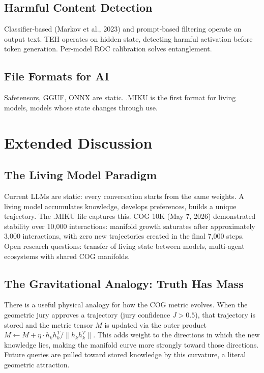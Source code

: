 \documentclass[11pt]{article}
\begin{document}
\subsection{Harmful Content Detection}
Classifier-based (Markov et al., 2023) and prompt-based filtering operate on output text. TEH operates on hidden state, detecting harmful activation before token generation. Per-model ROC calibration solves entanglement.

\subsection{File Formats for AI}
Safetensors, GGUF, ONNX are static. .MIKU is the first format for living models, models whose state changes through use.


\section{Extended Discussion}

\subsection{The Living Model Paradigm}
Current LLMs are static: every conversation starts from the same weights. A living model accumulates knowledge, develops preferences, builds a unique trajectory. The .MIKU file captures this. COG 10K (May 7, 2026) demonstrated stability over 10,000 interactions: manifold growth saturates after approximately 3,000 interactions, with zero new trajectories created in the final 7,000 steps. Open research questions: transfer of living state between models, multi-agent ecosystems with shared COG manifolds.

\subsection{The Gravitational Analogy: Truth Has Mass}

There is a useful physical analogy for how the COG metric evolves. When the
geometric jury approves a trajectory (jury confidence $J > 0.5$), that
trajectory is stored and the metric tensor $M$ is updated via the outer
product $M \leftarrow M + \eta \cdot h_k h_k^T / \|h_k h_k^T\|$. This adds
weight to the directions in which the new knowledge lies, making the manifold
curve more strongly toward those directions. Future queries are pulled toward
stored knowledge by this curvature, a literal geometric attraction.
\end{document}
